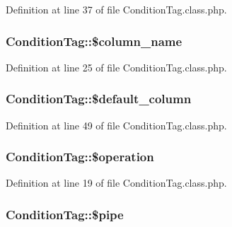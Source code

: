 Definition at line 37 of file Condition\+Tag.\+class.\+php.

\hypertarget{classConditionTag_a75d63b235f269dd4c12b3893fd456c10}{}
\subsubsection[{\$column\+\_\+name}]{\setlength{\rightskip}{0pt plus 5cm}Condition\+Tag\+::\$column\+\_\+name}\label{classConditionTag_a75d63b235f269dd4c12b3893fd456c10}


Definition at line 25 of file Condition\+Tag.\+class.\+php.

\hypertarget{classConditionTag_ac401b3684262dd2a0ff53ff9a97864fe}{}
\subsubsection[{\$default\+\_\+column}]{\setlength{\rightskip}{0pt plus 5cm}Condition\+Tag\+::\$default\+\_\+column}\label{classConditionTag_ac401b3684262dd2a0ff53ff9a97864fe}


Definition at line 49 of file Condition\+Tag.\+class.\+php.

\hypertarget{classConditionTag_a0f8be8743e1e43b334ee1b46d25fd02e}{}
\subsubsection[{\$operation}]{\setlength{\rightskip}{0pt plus 5cm}Condition\+Tag\+::\$operation}\label{classConditionTag_a0f8be8743e1e43b334ee1b46d25fd02e}


Definition at line 19 of file Condition\+Tag.\+class.\+php.

\hypertarget{classConditionTag_a52a8251ff965af25e284262fab02f7f5}{}
\subsubsection[{\$pipe}]{\setlength{\rightskip}{0pt plus 5cm}Condition\+Tag\+::\$pipe}\label{classConditionTag_a52a8251ff965af25e284262fab02f7f5}


